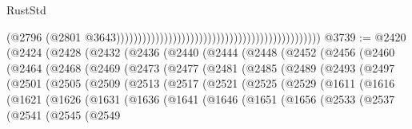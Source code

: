 \begin{lexlean}{RustStd}
\begin{coremodule}
                                                                                              (@2796
                                                                                                (@2801
                                                                                                  @3643)))))))))))))))))))))))))))))))))))))))))))))))
@3739 := @2420
    (@2424
      (@2428
        (@2432
          (@2436
            (@2440
              (@2444
                (@2448
                  (@2452
                    (@2456
                      (@2460
                        (@2464
                          (@2468
                            (@2469
                              (@2473
                                (@2477
                                  (@2481
                                    (@2485
                                      (@2489
                                        (@2493
                                          (@2497
                                            (@2501
                                              (@2505
                                                (@2509
                                                  (@2513
                                                    (@2517
                                                      (@2521
                                                        (@2525
                                                          (@2529
                                                            (@1611
                                                              (@1616
                                                                (@1621
                                                                  (@1626
                                                                    (@1631
                                                                      (@1636
                                                                        (@1641
                                                                          (@1646
                                                                            (@1651
                                                                              (@1656
                                                                                (@2533
                                                                                  (@2537
                                                                                    (@2541
                                                                                      (@2545
                                                                                        (@2549

\end{coremodule}
\end{lexlean}

